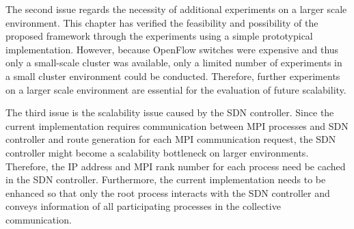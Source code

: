 The second issue regards the necessity of additional experiments on a
larger scale environment. This chapter has verified the feasibility and
possibility of the proposed framework through the experiments using a simple
prototypical implementation. However, because OpenFlow switches were expensive
and thus only a small-scale cluster was available, only a limited number of
experiments in a small cluster environment could be conducted. Therefore,
further experiments on a larger scale environment are essential for the
evaluation of future scalability.

The third issue is the scalability issue caused by the SDN controller.
Since the current implementation requires communication between MPI processes
and SDN controller and route generation for each MPI communication request,
the SDN controller might become a scalability bottleneck on larger
environments. Therefore, the IP address and MPI rank number for each process
need be cached in the SDN controller. Furthermore, the current implementation
needs to be enhanced so that only the root process interacts with the SDN
controller and conveys information of all participating processes in the
collective communication.
